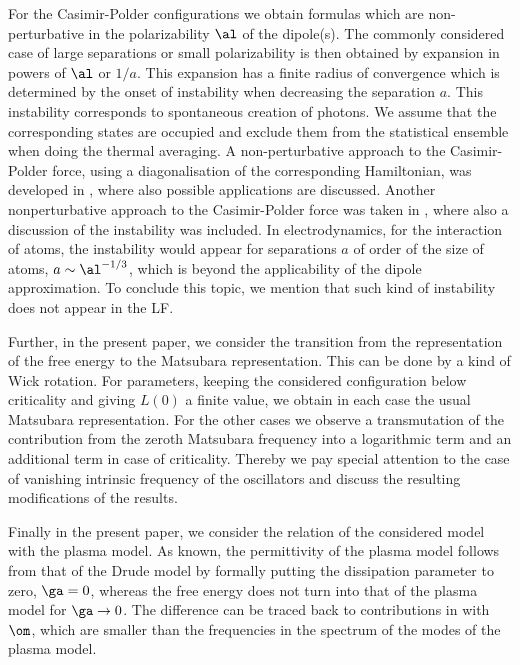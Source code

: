 \documentclass[notitlepage,prd,aps,longbibliography,twocolumn]{revtex4-1}
\begin{document}
For the Casimir-Polder configurations we obtain formulas which are non-perturbative in the polarizability $\al$ of the dipole(s). The commonly considered case of large separations or small polarizability is then obtained by expansion in powers of $\al$ or $1/a$. This expansion has a finite radius of convergence which is determined by the onset of instability when decreasing the separation $a$. This instability corresponds to spontaneous creation of photons. We assume that the corresponding states are occupied and exclude them from the statistical ensemble when doing the thermal averaging. A non-perturbative approach to the Casimir-Polder force, using a diagonalisation of the corresponding Hamiltonian, was developed in \cite{pass12-85-062109}, where also possible applications are discussed. Another nonperturbative approach to the Casimir-Polder force was taken in \cite{berm14-89-022127}, where also a discussion of the instability was included.
In electrodynamics, for the interaction of atoms, the instability would appear for separations $a$ of order of the size of atoms, $a\sim\al^{-1/3}$, which is beyond the applicability of the dipole approximation. To conclude this topic, we mention that such kind of instability does not appear in the LF.

Further, in the present paper, we consider the transition from the representation  of the free energy to the Matsubara representation. This can be done by a kind of  Wick rotation. For parameters, keeping the considered configuration below criticality  and giving $L(0)$ a finite value, we obtain in each case the usual Matsubara representation. For the other cases we observe a transmutation of the contribution from the zeroth Matsubara frequency into a logarithmic term and an additional term in case of criticality. Thereby we pay special attention to the case of vanishing intrinsic frequency of the oscillators and discuss the resulting modifications of the results.

Finally in the present paper, we consider the relation of the considered model with the plasma model. As known, the permittivity of the plasma model follows from that of the Drude model by formally putting the dissipation parameter to zero, $\ga=0$, whereas the free energy does not turn into that of the plasma model for $\ga\to0$. The difference can be traced back to contributions in  with $\om$, which are smaller than the frequencies in the spectrum of the modes of the plasma model.
\end{document}
